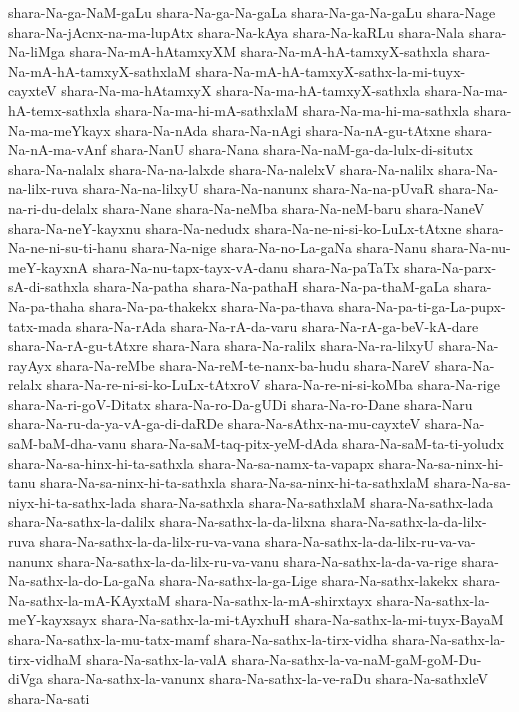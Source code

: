 {shara-Na-ga-NaM-gaLu
shara-Na-ga-Na-gaLa
shara-Na-ga-Na-gaLu
shara-Nage
shara-Na-jAcnx-na-ma-lupAtx
shara-Na-kAya
shara-Na-kaRLu
shara-Nala
shara-Na-liMga
shara-Na-mA-hAtamxyXM
shara-Na-mA-hA-tamxyX-sathxla
shara-Na-mA-hA-tamxyX-sathxlaM
shara-Na-mA-hA-tamxyX-sathx-la-mi-tuyx-cayxteV
shara-Na-ma-hAtamxyX
shara-Na-ma-hA-tamxyX-sathxla
shara-Na-ma-hA-temx-sathxla
shara-Na-ma-hi-mA-sathxlaM
shara-Na-ma-hi-ma-sathxla
shara-Na-ma-meYkayx
shara-Na-nAda
shara-Na-nAgi
shara-Na-nA-gu-tAtxne
shara-Na-nA-ma-vAnf
shara-NanU
shara-Nana
shara-Na-naM-ga-da-lulx-di-situtx
shara-Na-nalalx
shara-Na-na-lalxde
shara-Na-nalelxV
shara-Na-nalilx
shara-Na-na-lilx-ruva
shara-Na-na-lilxyU
shara-Na-nanunx
shara-Na-na-pUvaR
shara-Na-na-ri-du-delalx
shara-Nane
shara-Na-neMba
shara-Na-neM-baru
shara-NaneV
shara-Na-neY-kayxnu
shara-Na-nedudx
shara-Na-ne-ni-si-ko-LuLx-tAtxne
shara-Na-ne-ni-su-ti-hanu
shara-Na-nige
shara-Na-no-La-gaNa
shara-Nanu
shara-Na-nu-meY-kayxnA
shara-Na-nu-tapx-tayx-vA-danu
shara-Na-paTaTx
shara-Na-parx-sA-di-sathxla
shara-Na-patha
shara-Na-pathaH
shara-Na-pa-thaM-gaLa
shara-Na-pa-thaha
shara-Na-pa-thakekx
shara-Na-pa-thava
shara-Na-pa-ti-ga-La-pupx-tatx-mada
shara-Na-rAda
shara-Na-rA-da-varu
shara-Na-rA-ga-beV-kA-dare
shara-Na-rA-gu-tAtxre
shara-Nara
shara-Na-ralilx
shara-Na-ra-lilxyU
shara-Na-rayAyx
shara-Na-reMbe
shara-Na-reM-te-nanx-ba-hudu
shara-NareV
shara-Na-relalx
shara-Na-re-ni-si-ko-LuLx-tAtxroV
shara-Na-re-ni-si-koMba
shara-Na-rige
shara-Na-ri-goV-Ditatx
shara-Na-ro-Da-gUDi
shara-Na-ro-Dane
shara-Naru
shara-Na-ru-da-ya-vA-ga-di-daRDe
shara-Na-sAthx-na-mu-cayxteV
shara-Na-saM-baM-dha-vanu
shara-Na-saM-taq-pitx-yeM-dAda
shara-Na-saM-ta-ti-yoludx
shara-Na-sa-hinx-hi-ta-sathxla
shara-Na-sa-namx-ta-vapapx
shara-Na-sa-ninx-hi-tanu
shara-Na-sa-ninx-hi-ta-sathxla
shara-Na-sa-ninx-hi-ta-sathxlaM
shara-Na-sa-niyx-hi-ta-sathx-lada
shara-Na-sathxla
shara-Na-sathxlaM
shara-Na-sathx-lada
shara-Na-sathx-la-dalilx
shara-Na-sathx-la-da-lilxna
shara-Na-sathx-la-da-lilx-ruva
shara-Na-sathx-la-da-lilx-ru-va-vana
shara-Na-sathx-la-da-lilx-ru-va-va-nanunx
shara-Na-sathx-la-da-lilx-ru-va-vanu
shara-Na-sathx-la-da-va-rige
shara-Na-sathx-la-do-La-gaNa
shara-Na-sathx-la-ga-Lige
shara-Na-sathx-lakekx
shara-Na-sathx-la-mA-KAyxtaM
shara-Na-sathx-la-mA-shirxtayx
shara-Na-sathx-la-meY-kayxsayx
shara-Na-sathx-la-mi-tAyxhuH
shara-Na-sathx-la-mi-tuyx-BayaM
shara-Na-sathx-la-mu-tatx-mamf
shara-Na-sathx-la-tirx-vidha
shara-Na-sathx-la-tirx-vidhaM
shara-Na-sathx-la-valA
shara-Na-sathx-la-va-naM-gaM-goM-Du-diVga
shara-Na-sathx-la-vanunx
shara-Na-sathx-la-ve-raDu
shara-Na-sathxleV
shara-Na-sati
}
